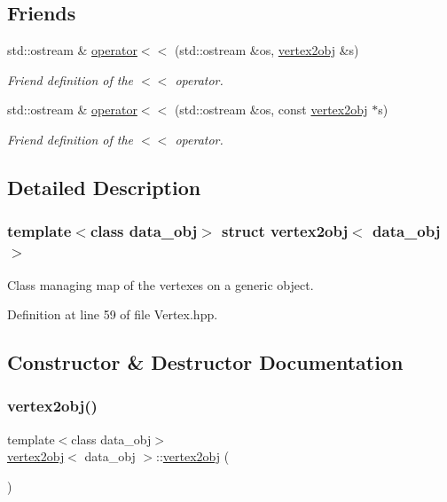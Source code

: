 \subsection*{Friends}
\begin{DoxyCompactItemize}
\item 
std\+::ostream \& \hyperlink{structvertex2obj_af8bfba9b533e41499a34caf198715262}{operator$<$$<$} (std\+::ostream \&os, \hyperlink{structvertex2obj}{vertex2obj} \&s)
\begin{DoxyCompactList}\small\item\em Friend definition of the $<$$<$ operator. \end{DoxyCompactList}\item 
std\+::ostream \& \hyperlink{structvertex2obj_a5de8fa8670478ea391d40aa1127d34ff}{operator$<$$<$} (std\+::ostream \&os, const \hyperlink{structvertex2obj}{vertex2obj} $\ast$s)
\begin{DoxyCompactList}\small\item\em Friend definition of the $<$$<$ operator. \end{DoxyCompactList}\end{DoxyCompactItemize}


\subsection{Detailed Description}
\subsubsection*{template$<$class data\+\_\+obj$>$\newline
struct vertex2obj$<$ data\+\_\+obj $>$}

Class managing map of the vertexes on a generic object. 

Definition at line 59 of file Vertex.\+hpp.



\subsection{Constructor \& Destructor Documentation}
\mbox{\label{structvertex2obj_a8ffbfccc140ddc7341419229a65d5a21}} 
\subsubsection{\texorpdfstring{vertex2obj()}{vertex2obj()}}
{\footnotesize\ttfamily template$<$class data\+\_\+obj$>$ \\
\hyperlink{structvertex2obj}{vertex2obj}$<$ data\+\_\+obj $>$\+::\hyperlink{structvertex2obj}{vertex2obj} (\begin{DoxyParamCaption}{ }\end{DoxyParamCaption})\hspace{0.3cm}{\ttfamily [default]}}



